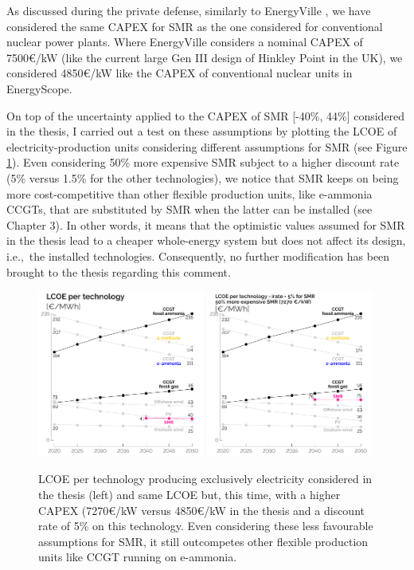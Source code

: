 \documentclass[12pt,a4paper]{article}
\def\ie{i.e.,\ }
\begin{document}
\noindent As discussed during the private defense, similarly to EnergyVille \cite{PATHS2050}, we have considered the same CAPEX for SMR as the one considered for conventional nuclear power plants. Where EnergyVille considers a nominal CAPEX of 7500€/kW (like the current large Gen III design of Hinkley Point in the UK), we considered 4850€/kW like the CAPEX of conventional nuclear units in EnergyScope. 

On top of the uncertainty applied to the CAPEX of SMR [-40\%, 44\%] considered in the thesis, I carried out a test on these assumptions by plotting the LCOE of electricity-production units considering different assumptions for SMR (see Figure \ref{fig:LCOE_comparison}). Even considering 50\% more expensive SMR subject to a higher discount rate (5\% versus 1.5\% for the other technologies), we notice that SMR keeps on being more cost-competitive than other flexible production units, like e-ammonia CCGTs, that are substituted by SMR when the latter can be installed (see Chapter 3). In other words, it means that the optimistic values assumed for SMR in the thesis lead to a cheaper whole-energy system but does not affect its design, \ie the installed technologies.  Consequently, no further modification has been brought to the thesis regarding this comment.

\begin{figure}[htbp!]
\centering
\includegraphics[width=0.49\textwidth]{LCOE_line_2.pdf}
\includegraphics[width=0.49\textwidth]{LCOE_line_3.pdf}
\label{fig:LCOE_comparison}
\caption{LCOE per technology producing exclusively electricity considered in the thesis (left) and same LCOE but, this time, with a higher CAPEX (7270€/kW versus 4850€/kW in the thesis and a discount rate of 5\% on this technology. Even considering these less favourable assumptions for SMR, it still outcompetes other flexible production units like CCGT running on e-ammonia.}
\end{figure}
\end{document}
